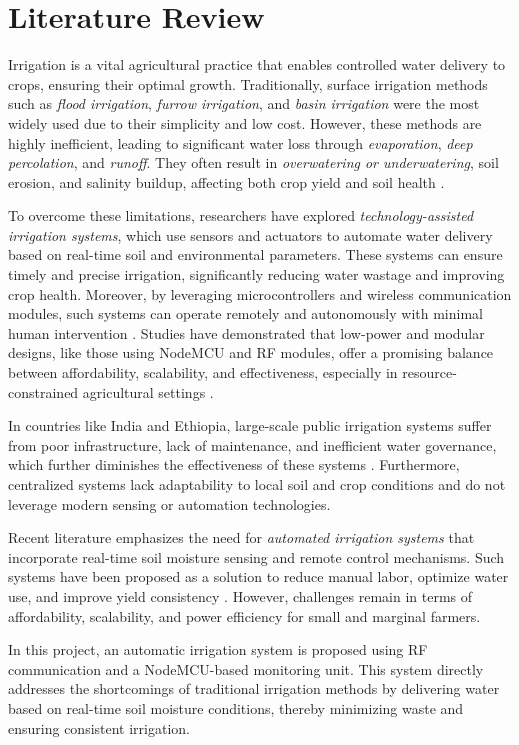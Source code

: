 \chapter{Literature Review}
\setlength\parindent{1cm}

Irrigation is a vital agricultural practice that enables controlled water delivery to crops, ensuring their optimal growth. Traditionally, surface irrigation methods such as \textit{flood irrigation}, \textit{furrow irrigation}, and \textit{basin irrigation} were the most widely used due to their simplicity and low cost. However, these methods are highly inefficient, leading to significant water loss through \textit{evaporation}, \textit{deep percolation}, and \textit{runoff}. They often result in \textit{overwatering or underwatering}, soil erosion, and salinity buildup, affecting both crop yield and soil health \cite{gupta2022}.

To overcome these limitations, researchers have explored \textit{technology-assisted irrigation systems}, which use sensors and actuators to automate water delivery based on real-time soil and environmental parameters. These systems can ensure timely and precise irrigation, significantly reducing water wastage and improving crop health. Moreover, by leveraging microcontrollers and wireless communication modules, such systems can operate remotely and autonomously with minimal human intervention \cite{kanthal2024,kanda2022}. Studies have demonstrated that low-power and modular designs, like those using NodeMCU and RF modules, offer a promising balance between affordability, scalability, and effectiveness, especially in resource-constrained agricultural settings \cite{nair2023}.

In countries like India and Ethiopia, large-scale public irrigation systems suffer from poor infrastructure, lack of maintenance, and inefficient water governance, which further diminishes the effectiveness of these systems \cite{ethiopia2022}. Furthermore, centralized systems lack adaptability to local soil and crop conditions and do not leverage modern sensing or automation technologies.

Recent literature emphasizes the need for \textit{automated irrigation systems} that incorporate real-time soil moisture sensing and remote control mechanisms. Such systems have been proposed as a solution to reduce manual labor, optimize water use, and improve yield consistency \cite{water2018}. However, challenges remain in terms of affordability, scalability, and power efficiency for small and marginal farmers.

In this project, an automatic irrigation system is proposed using RF communication and a NodeMCU-based monitoring unit. This system directly addresses the shortcomings of traditional irrigation methods by delivering water based on real-time soil moisture conditions, thereby minimizing waste and ensuring consistent irrigation.
